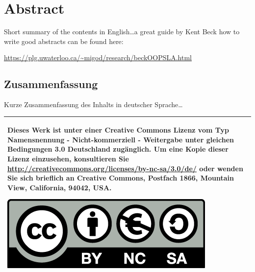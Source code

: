 \begingroup
\let\clearpage\relax
\let\cleardoublepage\relax
\let\cleardoublepage\relax


\ifx\myLanguage\english

\chapter*{Abstract}
Short summary of the contents in English\dots a great guide by 
Kent Beck how to write good abstracts can be found here:  
\begin{center}
\url{https://plg.uwaterloo.ca/~migod/research/beckOOPSLA.html}
\end{center}

\vfill

\fi

\begin{otherlanguage}{ngerman}
\chapter*{Zusammenfassung}
Kurze Zusammenfassung des Inhalts in deutscher Sprache\dots 
\end{otherlanguage}

\endgroup			

\vfill

\begin{tabular}{|p{}|}
  \hline
  Dieses Werk ist unter einer Creative Commons Lizenz vom Typ Namensnennung - Nicht-kommerziell - Weitergabe unter gleichen Bedingungen 3.0 Deutschland zugänglich. Um eine Kopie dieser Lizenz einzusehen, konsultieren Sie \url{http://creativecommons.org/licenses/by-nc-sa/3.0/de/} oder wenden Sie sich brieflich an Creative Commons, Postfach 1866, Mountain View, California, 94042, USA.
  \begin{center}
	\includegraphics[width=.6\textwidth]{images/by-nc-sa_eu.png}
  \end{center}\\
  \hline
\end{tabular}